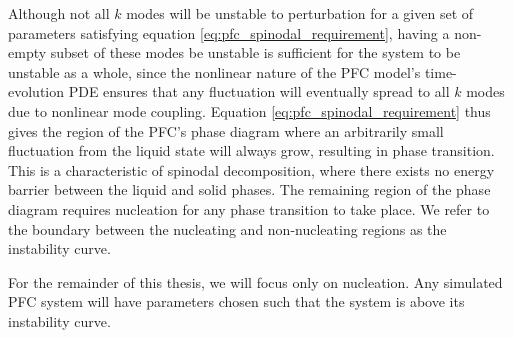 Although not all $k$ modes will be unstable to perturbation for a given set of parameters satisfying equation \ref{eq:pfc_spinodal_requirement}, having a non-empty subset of these modes be unstable is sufficient for the system to be unstable as a whole, since the nonlinear nature of the PFC model's time-evolution PDE ensures that any fluctuation will eventually spread to all $k$ modes due to nonlinear mode coupling. Equation \ref{eq:pfc_spinodal_requirement} thus gives the region of the PFC's phase diagram where an arbitrarily small fluctuation from the liquid state will always grow, resulting in phase transition. This is a characteristic of spinodal decomposition, where there exists no energy barrier between the liquid and solid phases. The remaining region of the phase diagram requires nucleation for any phase transition to take place. We refer to the boundary between the nucleating and non-nucleating regions as the instability curve.

For the remainder of this thesis, we will focus only on nucleation. Any simulated PFC system will have parameters chosen such that the system is above its instability curve.







